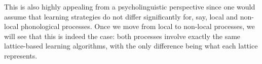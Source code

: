 This is also highly appealing from a psycholinguistic perspective since one would assume that learning strategies do not differ significantly for, say, local and non-local phonological processes.
Once we move from local to non-local processes, we will see that this is indeed the case: both processes involve exactly the same lattice-based learning algorithms,  with the only difference being what each lattice represents.
